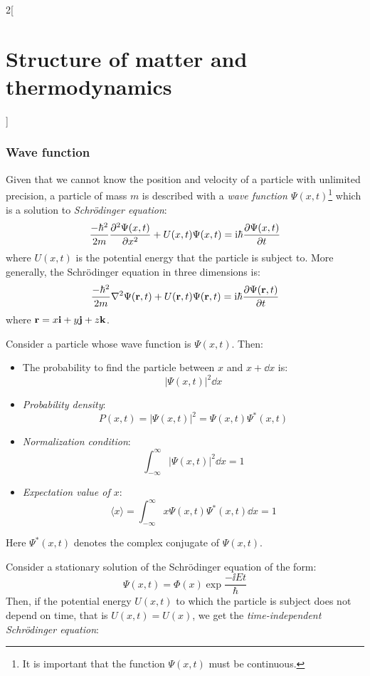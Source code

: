 \documentclass[../../../main.tex]{subfiles}
\begin{document}
\begin{multicols}{2}[\section{Structure of matter and thermodynamics}]
    \subsubsection*{Wave function}
    \begin{definition}
        Given that we cannot know the position and velocity of a particle with unlimited precision, a particle of mass $m$ is described with a \textit{wave function $\Psi(x,t)$}\footnote{It is important that the function $\Psi(x,t)$ must be continuous.} which is a solution to \textit{Schrödinger equation}:
        $$\frac{-\hbar^2}{2m}\pdv[2]{\Psi(x,t)}{x}+U(x,t)\Psi(x,t)=\mathrm{i}\hbar\pdv{\Psi(x,t)}{t}$$
        where $U(x,t)$ is the potential energy that the particle is subject to. More generally, the Schrödinger equation in three dimensions is:
        $$\frac{-\hbar^2}{2m}\nabla^2\Psi(\vb{r},t)+U(\vb{r},t)\Psi(\vb{r},t)=\mathrm{i}\hbar\pdv{\Psi(\vb{r},t)}{t}$$ where $\vb{r}=x\vb{i}+y\vb{j}+z\vb{k}$.
    \end{definition}
    \begin{prop}
        Consider a particle whose wave function is $\Psi(x,t)$. Then:
        \begin{itemize}
            \item The probability to find the particle between $x$ and $x+\dd x$ is: $$|\Psi(x,t)|^2\dd x$$
            \item \textit{Probability density}: $$P(x,t)=|\Psi(x,t)|^2=\Psi(x,t)\Psi^*(x,t)$$
            \item \textit{Normalization condition}: $$\int_{-\infty}^\infty|\Psi(x,t)|^2\dd x=1$$
            \item \textit{Expectation value of $x$}: $$\langle x\rangle=\int_{-\infty}^\infty x\Psi(x,t)\Psi^*(x,t)\dd x=1$$
        \end{itemize}
        Here $\Psi^*(x,t)$ denotes the complex conjugate of $\Psi(x,t)$.
    \end{prop}
    \begin{definition}
        Consider a stationary solution of the Schrödinger equation of the form: $$\Psi(x,t)=\Phi(x)\exp{\frac{-\ii Et}{\hbar}}$$
        Then, if the potential energy $U(x,t)$ to which the particle is subject does not depend on time, that is $U(x,t)=U(x)$, we get the \textit{time-independent Schrödinger equation}:
        \begin{equation}\label{SMT-TI_schrodinger}

\end{equation}
\end{definition}
\end{multicols}
\end{document}
